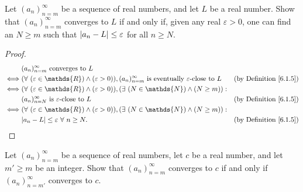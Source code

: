 \begin{exercise}\label{ex 6.1.2}
Let \((a_n)_{n = m}^\infty\) be a sequence of real numbers, and let \(L\) be a real number.
Show that \((a_n)_{n = m}^\infty\) converges to \(L\) if and only if, given any real \(\varepsilon > 0\), one can find an \(N \geq m\) such that \(\abs*{a_n - L} \leq \varepsilon\) for all \(n \geq N\).
\end{exercise}

\begin{proof}
\begin{align*}
& (a_n)_{n = m}^\infty \text{ converges to } L \\
\iff & (\forall\ (\varepsilon \in \mathds{R}) \land (\varepsilon > 0)), (a_n)_{n = m}^\infty \text{ is eventually } \varepsilon\text{-close to } L & \text{(by Definition \ref{6.1.5})} \\
\iff & (\forall\ (\varepsilon \in \mathds{R}) \land (\varepsilon > 0)), (\exists\ (N \in \mathds{N}) \land (N \geq m)) : \\
& (a_n)_{n = N}^\infty \text{ is } \varepsilon\text{-close to } L & \text{(by Definition \ref{6.1.5})} \\
\iff & (\forall\ (\varepsilon \in \mathds{R}) \land (\varepsilon > 0)), (\exists\ (N \in \mathds{N}) \land (N \geq m)) : \\
& \abs*{a_n - L} \leq \varepsilon \ \forall\ n \geq N. & \text{(by Definition \ref{6.1.5})}
\end{align*}
\end{proof}

\begin{exercise}\label{ex 6.1.3}
Let \((a_n)_{n = m}^\infty\) be a sequence of real numbers, let \(c\) be a real number, and let \(m' \geq m\) be an integer.
Show that \((a_n)_{n = m}^\infty\) converges to \(c\) if and only if \((a_n)_{n = m'}^\infty\) converges to \(c\).
\end{exercise}

